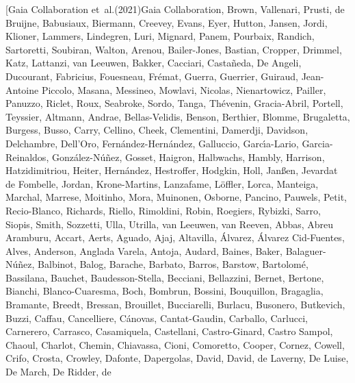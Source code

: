 \documentclass[twocolumn]{aastex631}
\begin{document}
\begin{thebibliography}{}
\bibitem[{{Gaia Collaboration} {et~al.}(2021){Gaia Collaboration}, {Brown},
  {Vallenari}, {Prusti}, {de Bruijne}, {Babusiaux}, {Biermann}, {Creevey},
  {Evans}, {Eyer}, {Hutton}, {Jansen}, {Jordi}, {Klioner}, {Lammers},
  {Lindegren}, {Luri}, {Mignard}, {Panem}, {Pourbaix}, {Randich}, {Sartoretti},
  {Soubiran}, {Walton}, {Arenou}, {Bailer-Jones}, {Bastian}, {Cropper},
  {Drimmel}, {Katz}, {Lattanzi}, {van Leeuwen}, {Bakker}, {Cacciari},
  {Casta{\~n}eda}, {De Angeli}, {Ducourant}, {Fabricius}, {Fouesneau},
  {Fr{\'e}mat}, {Guerra}, {Guerrier}, {Guiraud}, {Jean-Antoine Piccolo},
  {Masana}, {Messineo}, {Mowlavi}, {Nicolas}, {Nienartowicz}, {Pailler},
  {Panuzzo}, {Riclet}, {Roux}, {Seabroke}, {Sordo}, {Tanga}, {Th{\'e}venin},
  {Gracia-Abril}, {Portell}, {Teyssier}, {Altmann}, {Andrae}, {Bellas-Velidis},
  {Benson}, {Berthier}, {Blomme}, {Brugaletta}, {Burgess}, {Busso}, {Carry},
  {Cellino}, {Cheek}, {Clementini}, {Damerdji}, {Davidson}, {Delchambre},
  {Dell'Oro}, {Fern{\'a}ndez-Hern{\'a}ndez}, {Galluccio}, {Garc{\'\i}a-Lario},
  {Garcia-Reinaldos}, {Gonz{\'a}lez-N{\'u}{\~n}ez}, {Gosset}, {Haigron},
  {Halbwachs}, {Hambly}, {Harrison}, {Hatzidimitriou}, {Heiter},
  {Hern{\'a}ndez}, {Hestroffer}, {Hodgkin}, {Holl}, {Jan{\ss}en}, {Jevardat de
  Fombelle}, {Jordan}, {Krone-Martins}, {Lanzafame}, {L{\"o}ffler}, {Lorca},
  {Manteiga}, {Marchal}, {Marrese}, {Moitinho}, {Mora}, {Muinonen}, {Osborne},
  {Pancino}, {Pauwels}, {Petit}, {Recio-Blanco}, {Richards}, {Riello},
  {Rimoldini}, {Robin}, {Roegiers}, {Rybizki}, {Sarro}, {Siopis}, {Smith},
  {Sozzetti}, {Ulla}, {Utrilla}, {van Leeuwen}, {van Reeven}, {Abbas}, {Abreu
  Aramburu}, {Accart}, {Aerts}, {Aguado}, {Ajaj}, {Altavilla}, {{\'A}lvarez},
  {{\'A}lvarez Cid-Fuentes}, {Alves}, {Anderson}, {Anglada Varela}, {Antoja},
  {Audard}, {Baines}, {Baker}, {Balaguer-N{\'u}{\~n}ez}, {Balbinot}, {Balog},
  {Barache}, {Barbato}, {Barros}, {Barstow}, {Bartolom{\'e}}, {Bassilana},
  {Bauchet}, {Baudesson-Stella}, {Becciani}, {Bellazzini}, {Bernet}, {Bertone},
  {Bianchi}, {Blanco-Cuaresma}, {Boch}, {Bombrun}, {Bossini}, {Bouquillon},
  {Bragaglia}, {Bramante}, {Breedt}, {Bressan}, {Brouillet}, {Bucciarelli},
  {Burlacu}, {Busonero}, {Butkevich}, {Buzzi}, {Caffau}, {Cancelliere},
  {C{\'a}novas}, {Cantat-Gaudin}, {Carballo}, {Carlucci}, {Carnerero},
  {Carrasco}, {Casamiquela}, {Castellani}, {Castro-Ginard}, {Castro Sampol},
  {Chaoul}, {Charlot}, {Chemin}, {Chiavassa}, {Cioni}, {Comoretto}, {Cooper},
  {Cornez}, {Cowell}, {Crifo}, {Crosta}, {Crowley}, {Dafonte}, {Dapergolas},
  {David}, {David}, {de Laverny}, {De Luise}, {De March}, {De Ridder}, {de
}}
\end{thebibliography}
\end{document}
